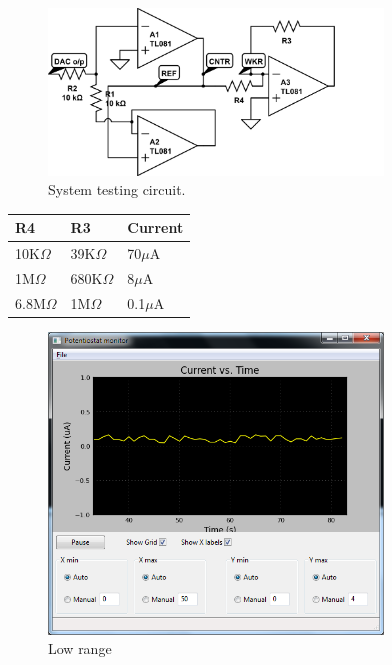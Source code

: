 \begin{figure} 
\begin{center}
\includegraphics[width=3.5in]{../figures/system_testing.png}
\end{center}
\caption{System testing circuit.}
\label{fig:sys_test}
\end{figure}

\begin{center}
\begin{tabular}{l l l}
R4 & R3 & Current \\
\hline
10K$\Omega$ & 39K$\Omega$ & 70$\mu$A \\
1M$\Omega$ & 680K$\Omega$ & 8$\mu$A \\
6.8M$\Omega$ & 1M$\Omega$ & 0.1$\mu$A \\
\end{tabular}
\end{center}

\begin{figure}[h]
\begin{center}
\includegraphics[width=3.5in]{../figures/1Mohm_0,1uA_6,8Mohm.png}
\end{center}
\caption{Low range}
\label{fig:sys_test_low}
\end{figure}

